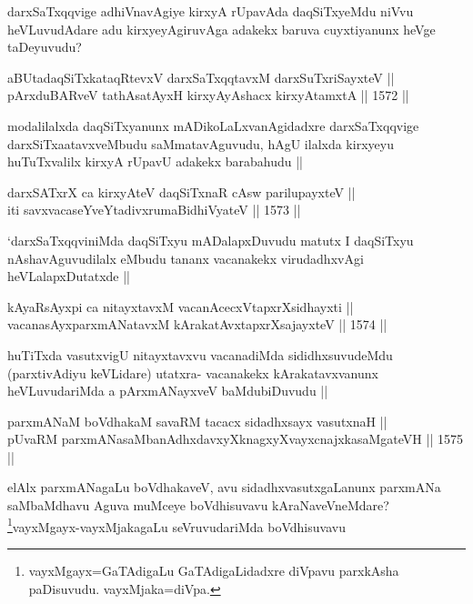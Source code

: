 \begin{artha}
darxSaTxqqvige adhiVnavAgiye kirxyA rUpavAda daqSiTxyeMdu niVvu heVLuvudAdare adu kirxyeyAgiruvAga adakekx baruva cuyxtiyanunx heVge taDeyuvudu?
\end{artha}

\begin{shl}
aBUtadaqSiTxkataqRtevxV darxSaTxqqtavxM darxSuTxriSayxteV ||  \\
pArxduBARveV tathA\s satAyxH kirxyAyAshacx kirxyAtamxtA ||  1572 ||  
\end{shl}

\begin{artha}
modalilalxda daqSiTxyanunx mADikoLaLxvanAgidadxre darxSaTxqqvige darxSiTxaatavxveMbudu saMmatavAguvudu, hAgU ilalxda kirxyeyu huTuTxvalilx kirxyA rUpavU adakekx barabahudu ||
\end{artha}


\begin{shl}
darxSATxrX ca kirxyAteV daqSiTxnaR cAsw parilupayxteV || \\
iti savxvacaseYveYtadivxrumaBidhiVyateV ||  1573 ||  
\end{shl}

\begin{artha}
`darxSaTxqqviniMda daqSiTxyu mADalapxDuvudu matutx I daqSiTxyu nAshavAguvudilalx eMbudu tananx vacanakekx virudadhxvAgi heVLalapxDutatxde ||
\end{artha}


\begin{shl}
kAyaRsAyxpi ca nitayxtavxM vacanAcecxVtapxrXsidhayxti ||  \\
vacanasAyxparxmANatavxM kArakatAvxtapxrXsajayxteV ||  1574 ||  
\end{shl}

\begin{artha}
huTiTxda vasutxvigU nitayxtavxvu vacanadiMda sididhxsuvudeMdu (parxtivAdiyu keVLidare) utatxra- vacanakekx kArakatavxvanunx heVLuvudariMda a pArxmANayxveV baMdubiDuvudu ||
\end{artha}

\begin{shl}
parxmANaM boVdhakaM savaRM tacacx sidadhxsayx vasutxnaH || \\
pUvaRM parxmANasaMbanAdhxdavxyXknagxyXvayxcnajxkasaMgateVH ||  1575 ||  
\end{shl}

\begin{artha}
elAlx parxmANagaLu boVdhakaveV, avu sidadhxvasutxgaLanunx parxmANa saMbaMdhavu Aguva muMceye boVdhisuvavu kAraNaveVneMdare? \footnote{vayxMgayx=GaTAdigaLu GaTAdigaLidadxre diVpavu parxkAsha paDisuvudu. vayxMjaka=diVpa.}vayxMgayx-vayxMjakagaLu seVruvudariMda boVdhisuvavu
\end{artha} 
